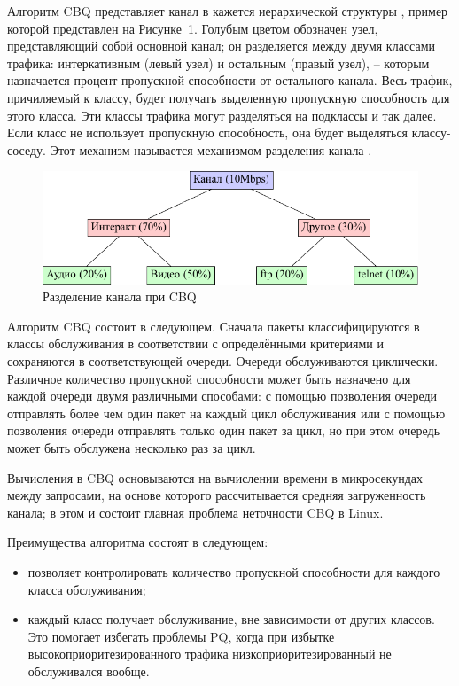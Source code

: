 		Алгоритм CBQ представляет канал в кажется иерархической структуры \cite{linksharing},
		пример которой представлен на Рисунке~\ref{pic:cbq}. Голубым цветом обозначен узел,
		представляющий собой основной канал; он разделяется между двумя классами трафика:
		интеркативным (левый узел) и остальным (правый узел), -- которым назначается процент
		пропускной способности от остального канала. Весь трафик, причиляемый к классу,
		будет получать выделенную пропускную способность для этого класса. Эти
		классы трафика могут разделяться на подклассы и так далее. Если класс не использует
		пропускную способность, она будет выделяться классу-соседу. Этот механизм
		называется механизмом разделения канала \cite{linksharing}. 

        \begin{figure}[ht!]
			\center
            \includegraphics[scale=1.2]{./pdfimages/cbq.pdf}
            \caption{Разделение канала при CBQ}
			\label{pic:cbq}
        \end{figure}

        Алгоритм CBQ состоит в следующем. Сначала пакеты классифицируются в классы
        обслуживания в соответствии с определёнными критериями и сохраняются в
        соответствующей очереди. Очереди обслуживаются циклически. Различное
        количество пропускной способности может быть назначено для каждой очереди
        двумя различными способами: с помощью позволения очереди отправлять более
        чем один пакет на каждый цикл обслуживания или с помощью позволения очереди
        отправлять только один пакет за цикл, но при этом очередь может быть обслужена
        несколько раз за цикл.\cite{packethandling}

		Вычисления в CBQ основываются на вычислении времени в микросекундах между
		запросами, на основе которого рассчитывается средняя загруженность канала;
		в этом и состоит главная проблема неточности CBQ в Linux.\cite{lartc} 

        Преимущества алгоритма состоят в следующем:
        \begin{itemize}
            \item позволяет контролировать количество пропускной способности для каждого
                  класса обслуживания;
            \item каждый класс получает обслуживание, вне зависимости от других классов. Это
                  помогает избегать проблемы PQ, когда при избытке высокоприоритезированного
                  трафика низкоприоритезированный не обслуживался вообще.\cite{packethandling}
        \end{itemize}

